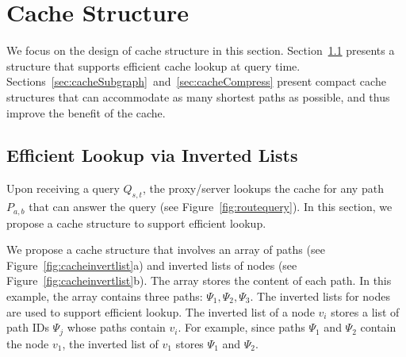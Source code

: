 \documentclass{sig-alternate}
\begin{document}
%
%
%





\section{Cache Structure} \label{sec:CacheStruct}
%
We focus on the design of cache structure in this section.
Section~\ref{sec:cacheLookup} presents a structure that supports efficient cache lookup at query time.
Sections~\ref{sec:cacheSubgraph}~and~\ref{sec:cacheCompress} present
compact cache structures that can accommodate as many shortest paths as possible,
and thus improve the benefit of the cache.


\subsection{Efficient Lookup via Inverted Lists}\label{sec:cacheLookup}
%
Upon receiving a query $Q_{s,t}$, the proxy/server lookups the cache
for any path $P_{a,b}$ that can answer the query (see Figure~\ref{fig:routequery}).
In this section, we propose a cache structure to support efficient lookup.


We propose a cache structure that involves an array of paths (see Figure~\ref{fig:cacheinvertlist}a)
and inverted lists of nodes (see Figure~\ref{fig:cacheinvertlist}b).
The array stores the content of each path.
In this example, the array contains three paths: $\Psi_1, \Psi_2, \Psi_3$.
The inverted lists for nodes are used to support efficient lookup.
The inverted list of a node $v_i$ stores a list of path IDs $\Psi_j$ whose paths contain $v_i$.
For example, since paths $\Psi_1$ and $\Psi_2$ contain the node $v_1$,
the inverted list of $v_1$ stores $\Psi_1$ and $\Psi_2$.
\end{document}
